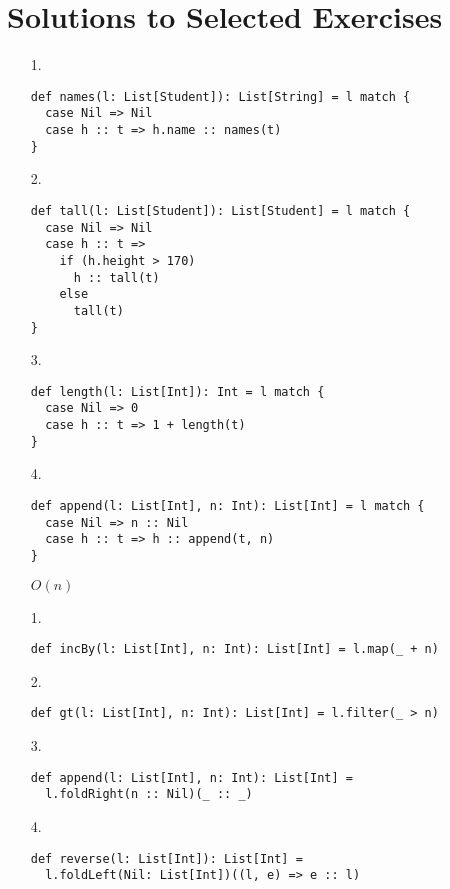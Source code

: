 \setchapterpreamble[u]{\margintoc}
\chapter{Solutions to Selected Exercises}

\textbf{}
\begin{enumerate}
\item[1.]
\begin{verbatim}
def names(l: List[Student]): List[String] = l match {
  case Nil => Nil
  case h :: t => h.name :: names(t)
}
\end{verbatim}
\item[2.]
\begin{verbatim}
def tall(l: List[Student]): List[Student] = l match {
  case Nil => Nil
  case h :: t =>
    if (h.height > 170)
      h :: tall(t)
    else
      tall(t)
}
\end{verbatim}
\item[3.]
\begin{verbatim}
def length(l: List[Int]): Int = l match {
  case Nil => 0
  case h :: t => 1 + length(t)
}
\end{verbatim}
\item[4.]
\begin{verbatim}
def append(l: List[Int], n: Int): List[Int] = l match {
  case Nil => n :: Nil
  case h :: t => h :: append(t, n)
}
\end{verbatim}
$O(n)$
\end{enumerate}

\textbf{}

\begin{enumerate}
\item[1.]
\begin{verbatim}
def incBy(l: List[Int], n: Int): List[Int] = l.map(_ + n)
\end{verbatim}
\item[2.]
\begin{verbatim}
def gt(l: List[Int], n: Int): List[Int] = l.filter(_ > n)
\end{verbatim}
\item[3.]
\begin{verbatim}
def append(l: List[Int], n: Int): List[Int] =
  l.foldRight(n :: Nil)(_ :: _)
\end{verbatim}
\item[4.]
\begin{verbatim}
def reverse(l: List[Int]): List[Int] =
  l.foldLeft(Nil: List[Int])((l, e) => e :: l)
\end{verbatim}
\end{enumerate}
